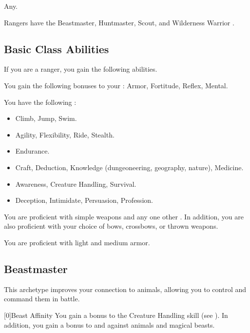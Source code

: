      Any.

     Rangers have the Beastmaster, Huntmaster, Scout, and Wilderness Warrior .

    \subsection{Basic Class Abilities}
        If you are a ranger, you gain the following abilities.

        You gain the following bonuses to your :  Armor,  Fortitude,  Reflex,  Mental.

        You have the following :
        \begin{itemize}
            \item {} Climb, Jump, Swim.
            \item {} Agility, Flexibility, Ride, Stealth.
            \item {} Endurance.
            \item {} Craft, Deduction, Knowledge (dungeoneering, geography, nature), Medicine.
            \item {} Awareness, Creature Handling, Survival.
            \item {} Deception, Intimidate, Persuasion, Profession.
        \end{itemize}

        You are proficient with simple weapons and any one other .
        In addition, you are also proficient with your choice of bows, crossbows, or thrown weapons.

        You are proficient with light and medium armor.

    \newpage
    \subsection{Beastmaster}
        This archetype improves your connection to animals, allowing you to control and command them in battle.

        [0]{Beast Affinity} You gain a  bonus to the Creature Handling skill (see ).
        In addition, you gain a  bonus to  and  against animals and magical beasts.

